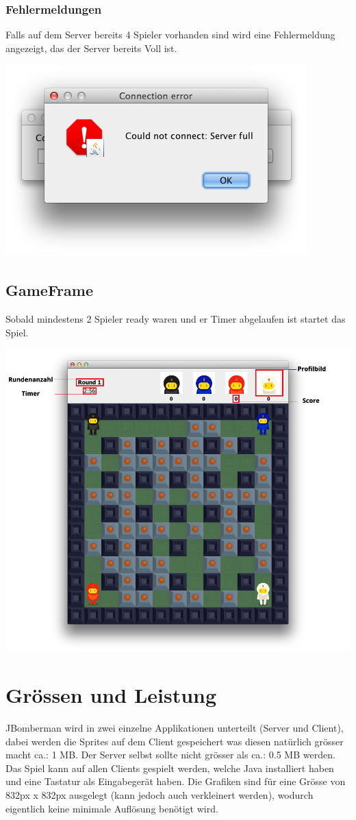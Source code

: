 \documentclass[11pt]{scrartcl}
\begin{document}
\subsubsection{Fehlermeldungen}
Falls auf dem Server bereits 4 Spieler vorhanden sind wird eine Fehlermeldung 
angezeigt, das der Server bereits Voll ist.

\includegraphics[scale=0.45]{ErrorServerFull}
\newpage
\subsection{GameFrame}
Sobald mindestens 2 Spieler ready waren und er Timer abgelaufen ist startet das 
Spiel.

\includegraphics[scale=0.45]{GameFrame}

\section{Grössen und Leistung}
JBomberman wird in zwei einzelne Applikationen unterteilt (Server und Client), dabei werden 
die Sprites auf dem Client gespeichert was diesen natürlich grösser macht ca.: 1 MB. 
Der Server selbst sollte nicht grösser als ca.: 0.5 MB werden.
Das Spiel kann auf allen Clients gespielt werden, welche Java installiert haben 
und eine Tastatur als Eingabegerät haben.
Die Grafiken sind für eine Grösse von 832px x 832px ausgelegt (kann jedoch auch 
verkleinert werden),
 wodurch eigentlich keine minimale Auflösung benötigt wird.
\end{document}

